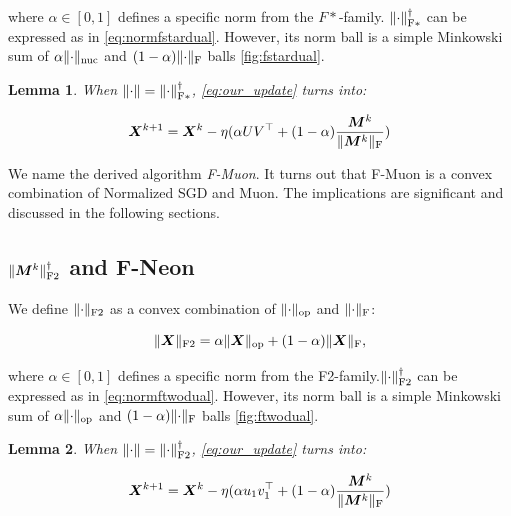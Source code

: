 \documentclass{article} %
\newtheorem{lemma}{Lemma}
\newcommand{\norm}[1]{\lVert #1\rVert}
\DeclarePairedDelimiter{\normf}{\|}{\|_\mathrm{F}}
\DeclarePairedDelimiter{\normfstar}{\|}{\|_\mathrm{F*}}
\DeclarePairedDelimiter{\normftwo}{\|}{\|_\mathrm{F2}}
\DeclarePairedDelimiter{\norms}{\|}{\|_{\mathrm{op}}}
\DeclarePairedDelimiter{\normn}{\|}{\|_{\mathrm{nuc}}}
\begin{document}
        where $\alpha \in [0, 1]$ defines a specific norm from the $F*$-family. $\normfstar{\cdot}^\dagger$ can be expressed as in \cref{eq:normfstardual}. However, its norm ball is a simple Minkowski sum of $\alpha \normn{\cdot}$ and $(1-\alpha)\normf{\cdot}$ balls \cref{fig:fstardual}.

    \begin{lemma}\label{lemma:nsgd_muon_update}
        When $\norm{\cdot} = \normfstar{\cdot}^\dagger$, \cref{eq:our_update} turns into:

        \begin{equation}\label{eq:nsgd_muon_update}
            \mX^{k+1} = \mX^{k} - \eta (\alpha U V^\top + (1-\alpha)\frac{\mM^k}{\normf{\mM^k}})
        \end{equation}
    \end{lemma}

        We name the derived algorithm \emph{F-Muon}. It turns out that F-Muon is a convex combination of Normalized SGD and Muon. The implications are significant and discussed in the following sections.

    \subsection{\texorpdfstring{$\normftwo{\mM^{k}}^\dagger$ and F-Neon}{F-Neon}}
        We define $\normftwo{\cdot}$ as a convex combination of $\norms{\cdot}$ and $\normf{\cdot}$:

        \begin{equation}\label{eq:ftwo_norm}
            \normftwo{\mX} = \alpha \norms{\mX} + (1-\alpha)\normf{\mX},
        \end{equation}

        where $\alpha \in [0, 1]$ defines a specific norm from the F2-family.$\normftwo{\cdot}^\dagger$ can be expressed as in \cref{eq:normftwodual}. However, its norm ball is a simple Minkowski sum of $\alpha \norms{\cdot}$ and $(1-\alpha)\normf{\cdot}$ balls \cref{fig:ftwodual}.

    \begin{lemma}\label{lemma:nsgd_neon_update}    
        When $\norm{\cdot} = \normftwo{\cdot}^\dagger$, \cref{eq:our_update} turns into:

        \begin{equation}\label{eq:nsgd_neon_update}
            \mX^{k+1} = \mX^{k} - \eta (\alpha u_1 v_1^\top + (1-\alpha)\frac{\mM^k}{\normf{\mM^k}})
        \end{equation}
    \end{lemma}
\end{document}
